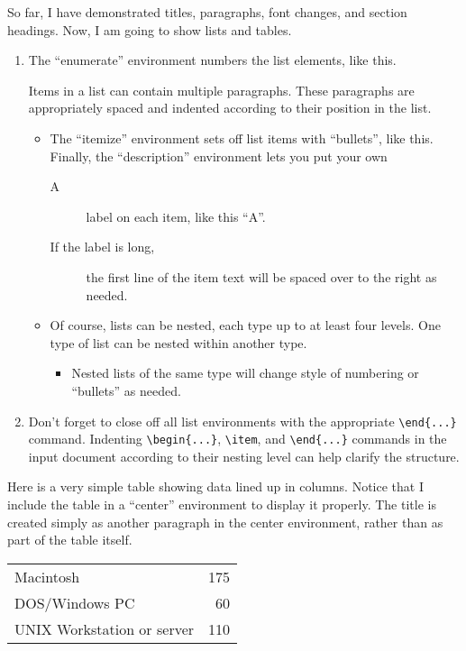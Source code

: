 So far, I have demonstrated titles, paragraphs, font changes, and
section headings.
Now, I am going to show lists and tables.
\begin{enumerate}
\item 
The ``enumerate'' environment numbers the list elements, like this.

Items in a list can contain multiple paragraphs.
These paragraphs are appropriately spaced and indented according to their
position in the list.
   \begin{itemize}
   \item The ``itemize'' environment sets off list items with ``bullets'',
like this.  Finally, the ``description'' environment lets you put your own
      \begin{description}
      \item[A] label on each item, like this ``A''.
      \item[If the label is long,] the first line of the item text will
be spaced over to the right as needed.
      \end{description}
   \item Of course, lists can be nested, each type up to at least four levels.
One type of list can be nested within another type.
      \begin{itemize}
      \item Nested lists of the same type will change style of numbering 
or ``bullets'' as needed.
      \end{itemize}
   \end{itemize}
\item Don't forget to close off all list environments with the 
appropriate \verb+\end{...}+ command.
Indenting \verb+\begin{...}+, \verb+\item+, and \verb+\end{...}+
commands in the input document according to their nesting level can help 
clarify the structure.
\end{enumerate}

Here is a very simple table showing data lined up in columns.
Notice that I include the table in a ``center'' environment to display
it properly.
The title is created simply as another paragraph in the center environment,
rather than as part of the table itself.

\begin{table}[H]
\centering
{}
\begin{tabular}{lr}
\hline
Macintosh		& 175\\
DOS/Windows PC	& 60\\
UNIX Workstation or server & 110\\
\hline
\end{tabular}
\end{table}

